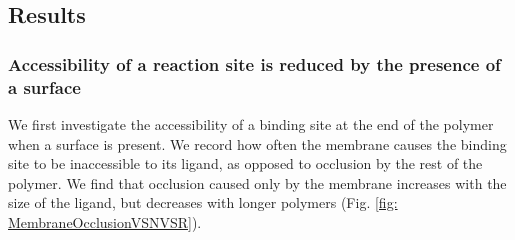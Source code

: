 \documentclass[../../AdvancementSummary.tex]{subfiles}
\begin{document}
%
%
%
%



\subsection{Results}

\subsubsection{Accessibility of a reaction site is reduced by the presence of a surface}

We first investigate the accessibility of a binding site at the end of the polymer when a surface is present. We record how often the membrane causes the binding site to be inaccessible to its ligand, as opposed to occlusion by the rest of the polymer. We find that occlusion caused only by the membrane increases with the size of the ligand, but decreases with longer polymers (Fig. \ref{fig: MembraneOcclusionVSNVSR}). 
\end{document}
